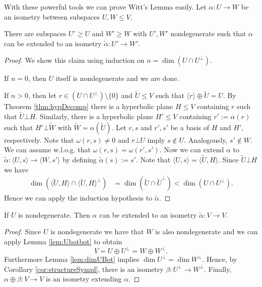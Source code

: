 With these powerful tools we can prove Witt's Lemma easily.
Let $\alpha\colon U\to W$ be an isometry between subspaces $U,W\leq V$.
\begin{lemma}\label{lem:wittPrep1}
	There are subspaces $U'\geq U$ and $W'\geq W$ with $U',W'$ nondegenerate such that $\alpha$ can be extended to an isometry $\tilde{\alpha}\colon U'\to W'$.
\end{lemma}
\begin{proof}
	We show this claim using induction on $n=\dim (U\cap U^\bot)$.
				
	If $n=0$, then $U$ itself is nondegenerate and we are done.
				
	If $n>0$, then let $r\in (U\cap U^\bot)\setminus\{0\}$ and $\tilde U\leq V$ such that $\langle r\rangle\oplus \tilde U=U$. By Theorem \ref{thm:hypDecomp} there is a hyperbolic plane $H\leq V$ containing $r$ such that $\tilde U\bot H$. 
	Similarly, there is a hyperbolic plane $H'\leq V$ containing $r':=\alpha(r)$ such that $H'\bot\tilde{W}$ with $\tilde{W}=\alpha(\tilde{U})$. Let $r,s$ and $r',s'$ be a basis of $H$ and $H'$, respectively. Note that $\omega(r,s)\not=0$ and $r\bot U$ imply $s\notin U$. Analogously, $s'\notin W$. We can assume w.l.o.g. that $\omega(r,s)=\omega(r',s')$. Now we can extend $\alpha$ to $\tilde{\alpha}\colon \langle U,s\rangle\to \langle W,s'\rangle$ by defining $\tilde\alpha (s):= s'$. Note that $\langle U,s\rangle=\langle \tilde{U},H\rangle$. Since $\tilde{U}\bot H$ we have
	\begin{align*}
		\dim(\langle \tilde{U},H\rangle \cap \langle \tilde{U},H\rangle^\bot) & =\dim(\tilde{U}\cap \tilde{U}^\bot)<\dim(U\cap U^\bot). 
	\end{align*}
	Hence we can apply the induction hypothesis to $\tilde{\alpha}$.
\end{proof}
		
\begin{lemma}\label{lem:wittPrep2}
	If $U$ is nondegenerate. Then $\alpha$ can be extended to an isometry $\tilde{\alpha}\colon V\to V$.
\end{lemma}
\begin{proof}
	Since $U$ is nondegenerate we have that $W$ is also nondegenerate and we can apply Lemma \ref{lem:Ubotbot} to obtain \[V=U\oplus U^\bot=W\oplus W^\bot.\]
	Furthermore Lemma \ref{lem:dimUBot} implies $\dim U^\bot=\dim W^\bot$. Hence, by Corollary \ref{cor:structureSympl}, there is an isometry $\beta\colon U^\bot\to W^\bot$. Finally, $\alpha\oplus \beta\colon V\to V$ is an isometry extending $\alpha$.
\end{proof}
		
